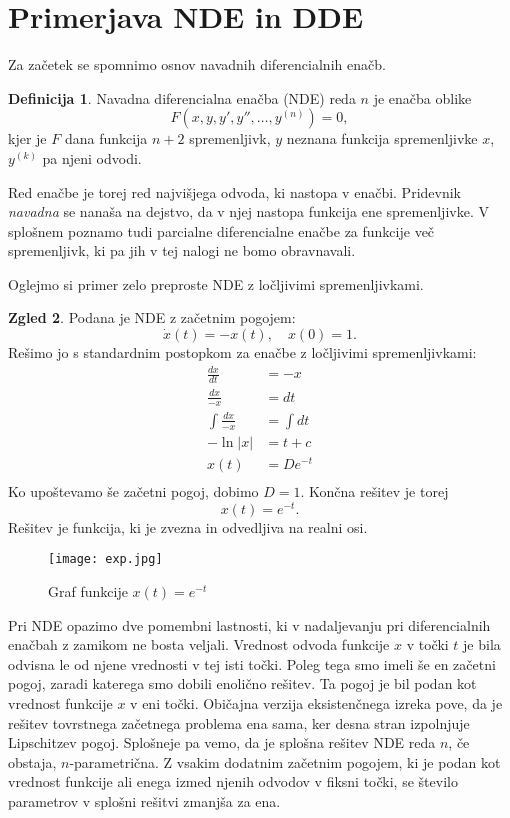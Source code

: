 \documentclass[12pt,a4paper]{amsart}
\theoremstyle{definition} %
\newtheorem{definicija}{Definicija}[section]
\newtheorem{zgled}[definicija]{Zgled}
\theoremstyle{plain} %
\begin{document}
\section{Primerjava NDE in DDE}

Za začetek se spomnimo osnov navadnih diferencialnih enačb.

\begin{definicija}
    Navadna diferencialna enačba (NDE) reda $n$ je enačba oblike
    \[F(x,y,y',y'',\dots,y^{(n)})=0,\]
    kjer je $F$ dana funkcija $n+2$ spremenljivk, $y$ neznana funkcija spremenljivke $x$, $y^{(k)}$ pa njeni
    odvodi.
\end{definicija}
Red enačbe je torej red najvišjega odvoda, ki nastopa v enačbi. Pridevnik \textit{navadna} se nanaša na dejstvo,
da v njej nastopa funkcija ene spremenljivke. V splošnem poznamo 
tudi parcialne diferencialne enačbe za funkcije več spremenljivk, ki pa jih v tej nalogi ne bomo obravnavali.

Oglejmo si primer zelo preproste NDE z ločljivimi spremenljivkami.

\begin{zgled}
    Podana je NDE z začetnim pogojem:
    \[\dot{x}(t) =-x(t),\quad x(0)=1.\]
    Rešimo jo s standardnim postopkom za enačbe z ločljivimi spremenljivkami:
    \begin{equation*}
    \begin{split}
      \frac{dx}{dt} & =-x \\
      \frac{dx}{-x} & =dt \\
      \int \frac{dx}{-x} & =\int dt \\
     -\ln|x| & =t+c \\
      x(t) & =De^{-t} \\
    \end{split}
    \end{equation*}
Ko upoštevamo še začetni pogoj, dobimo $D=1$. Končna rešitev je torej \[x(t)=e^{-t}.\]
Rešitev je funkcija, ki je zvezna in odvedljiva na realni osi.
\end{zgled}


\begin{figure}[h]
    \texttt{[image: exp.jpg]}
    \caption{Graf funkcije $x(t)=e^{-t}$}
\end{figure}


Pri NDE opazimo dve pomembni lastnosti, ki v nadaljevanju pri diferencialnih enačbah z zamikom ne bosta veljali. 
Vrednost odvoda funkcije $x$ v točki $t$ je bila odvisna le od njene vrednosti v tej isti točki. Poleg tega smo 
imeli še en začetni pogoj, zaradi katerega smo dobili enolično rešitev. Ta pogoj je bil podan kot vrednost funkcije
$x$ v eni točki. Običajna verzija eksistenčnega izreka pove, da je rešitev tovrstnega začetnega problema
ena sama, ker desna stran izpolnjuje Lipschitzev pogoj. Splošneje pa vemo, da
je splošna rešitev NDE reda $n$, če obstaja, $n$-parametrična.
Z vsakim dodatnim začetnim pogojem, ki je podan kot vrednost funkcije ali enega izmed njenih odvodov v fiksni točki,
se število parametrov v splošni rešitvi zmanjša za ena.
\end{document}
